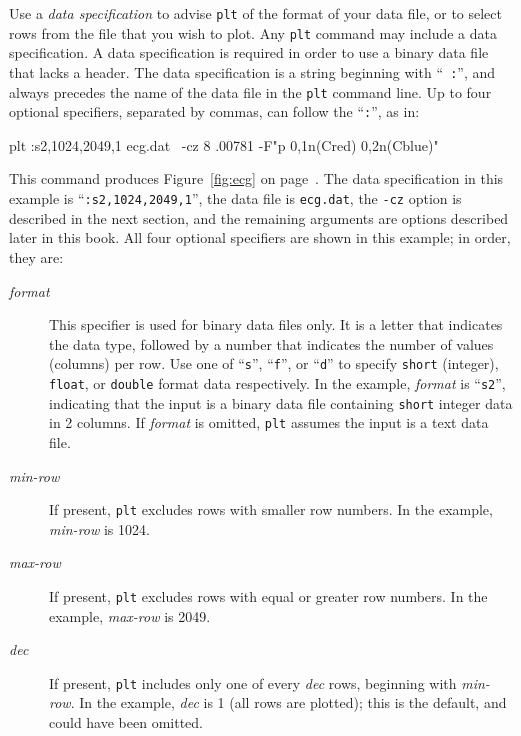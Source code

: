 \documentclass{book}
\begin{document}
%
Use a {\em data specification} to advise {\tt plt} of the format of
your data file, or to select rows from the file that you wish to plot.
Any {\tt plt} command may include a data specification.  A data
specification is required in order to use a binary data file that lacks a
header.  The data specification is a string beginning with ``{\tt
:}'', and always precedes the name of the data file in the {\tt plt}
command line.  Up to four optional specifiers, separated by commas,
can follow the ``{\tt :}'', as in:

\begin{center}
\begin{boxedverbatim}
plt :s2,1024,2049,1 ecg.dat \
    -cz 8 .00781 -F"p 0,1n(Cred) 0,2n(Cblue)"
\end{boxedverbatim}
\end{center}

\noindent
This command produces Figure~\ref{fig:ecg} on page~\pageref{fig:ecg}.  The data
specification in this example is ``{\tt :s2,1024,2049,1}'', the data file is
{\tt ecg.dat}, the {\tt -cz} option is described in the next section, and the
remaining arguments are options described later in this book.  All four
optional specifiers are shown in this example; in order, they are:

\begin{description}
\item[{\em format}]
This specifier is used for binary data files only.  It is a letter that
indicates the data type, followed by a number that indicates the number of
values (columns) per row.  Use one of ``{\tt s}'', ``{\tt f}'', or ``{\tt d}''
to specify {\tt short} (integer), {\tt float}, or {\tt double} format data
respectively.  In the example, {\em format} is ``{\tt s2}'', indicating that
the input is a binary data file containing {\tt short} integer data in 2
columns.  If {\em format} is omitted, {\tt plt} assumes the input is a text
data file.

\item[{\em min-row}]
If present, {\tt plt} excludes rows with smaller row numbers.  In the
example, {\em min-row} is 1024.

\item[{\em max-row}]
If present, {\tt plt} excludes rows with equal or greater row numbers.
In the example, {\em max-row} is 2049.

\item[{\em dec}] If present, {\tt plt} includes only one of every {\em dec}
rows, beginning with {\em min-row}.  In the example, {\em dec} is 1 (all rows
are plotted); this is the default, and could have been omitted.
\end{description}
\end{document}
